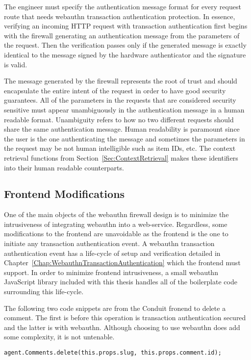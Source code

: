 The engineer must specify the authentication message format for every request route that needs webauthn transaction authentication protection. In essence, verifying an incoming HTTP request with transaction authentication first begins with the firewall generating an authentication message from the parameters of the request. Then the verification passes only if the generated message is exactly identical to the message signed by the hardware authenticator and the signature is valid.

The message generated by the firewall represents the root of trust and should encapsulate the entire intent of the request in order to have good security guarantees. All of the parameters in the requests that are considered security sensitive must appear unambiguously in the authentication message in a human readable format. Unambiguity refers to how no two different requests should share the same authentication message. Human readability is paramount since the user is the one authenticating the message and sometimes the parameters in the request may be not human intelligible such as item IDs, etc. The context retrieval functions from Section~\ref{Sec:ContextRetrieval} makes these identifiers into their human readable counterparts.

\subsection{Frontend Modifications}

One of the main objects of the webauthn firewall design is to minimize the intrusiveness of integrating webauthn into a web-service. Regardless, some modifications to the frontend are unavoidable as the frontend is the one to initiate any transaction authentication event. A webauthn transaction authentication event has a life-cycle of setup and verification detailed in Chapter~\ref{Chap:WebauthnTransactionAuthentication} which the frontend must support. In order to minimize frontend intrusiveness, a small webauthn JavaScript library included with this thesis handles all of the boilerplate code surrounding this life-cycle.

The following two code snippets are from the Conduit fronend to delete a comment. The first is before this operation is transaction authentication secured and the latter is with webauthn. Although choosing to use webauthn does add some complexity, it is not untenable.

\begin{lstlisting}
agent.Comments.delete(this.props.slug, this.props.comment.id);
\end{lstlisting}

